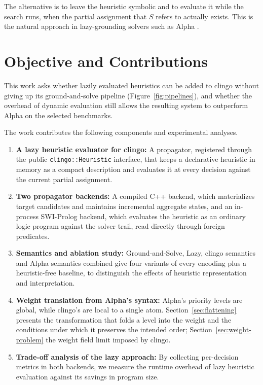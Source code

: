 The alternative is to leave the heuristic symbolic and to evaluate it while the search runs, when the partial assignment that $S$ refers to actually exists. This is the natural approach in lazy-grounding solvers such as Alpha \cite{weinzierl2017blending,comploi2023domain,comploi2023dynamicAggregates}. 

\section{Objective and Contributions}
\label{sec:contributions}

This work asks whether lazily evaluated heuristics can be added to clingo without giving up its ground-and-solve pipeline (Figure~\ref{fig:pipelines}), and whether the overhead of dynamic evaluation still allows the resulting system to outperform Alpha on the selected benchmarks.

The work contributes the following components and experimental analyses.

\begin{enumerate}
    \item \textbf{A lazy heuristic evaluator for clingo:} A propagator, registered through the public \texttt{clingo::Heuristic} interface, that keeps a declarative heuristic in memory as a compact description and evaluates it at every decision against the current partial assignment. 
    \item \textbf{Two propagator backends:} A compiled C++ backend, which materializes target candidates and maintains incremental aggregate states, and an in-process SWI-Prolog backend, which evaluates the heuristic as an ordinary logic program against the solver trail, read directly through foreign predicates.
    \item \textbf{Semantics and ablation study:} Ground-and-Solve, Lazy, clingo semantics and Alpha semantics combined give four variants of every encoding plus a heuristic-free baseline, to distinguish the effects of heuristic representation and interpretation.
    \item \textbf{Weight translation from Alpha's syntax:} Alpha's priority levels are global, while clingo's are local to a single atom. Section~\ref{sec:flattening} presents the transformation that folds a level into the weight and the conditions under which it preserves the intended order; Section~\ref{sec:weight-problem} the weight field limit imposed by clingo.
    \item \textbf{Trade-off analysis of the lazy approach:} By collecting per-decision metrics in both backends, we measure the runtime overhead of lazy heuristic evaluation against its savings in program size.
\end{enumerate}

